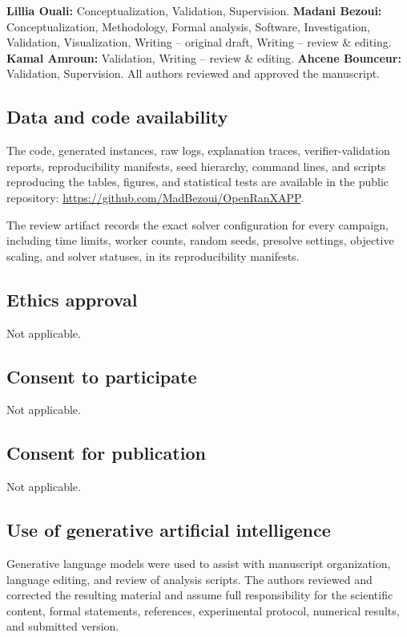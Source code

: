 \documentclass[pdflatex,sn-mathphys-num,iicol,oneside]{sn-jnl}
\begin{document}
\textbf{Lillia Ouali:} Conceptualization, Validation, Supervision. \textbf{Madani Bezoui:} Conceptualization, Methodology, Formal analysis, Software, Investigation, Validation, Visualization, Writing -- original draft, Writing -- review \& editing. \textbf{Kamal Amroun:} Validation, Writing -- review \& editing. \textbf{Ahcene Bounceur:} Validation, Supervision. All authors reviewed and approved the manuscript.

\subsection*{Data and code availability}

The code, generated instances, raw logs, explanation traces,
verifier-validation reports, reproducibility manifests, seed
hierarchy, command lines, and scripts reproducing the tables, figures,
and statistical tests are available in the public repository:
\url{https://github.com/MadBezoui/OpenRanXAPP}.

The review artifact records the exact solver configuration for every
campaign, including time limits, worker counts, random seeds,
presolve settings, objective scaling, and solver statuses, in its
reproducibility manifests.

\subsection*{Ethics approval}

Not applicable.

\subsection*{Consent to participate}

Not applicable.

\subsection*{Consent for publication}

Not applicable.

\subsection*{Use of generative artificial intelligence}

Generative language models were used to assist with manuscript
organization, language editing, and review of analysis scripts. The
authors reviewed and corrected the resulting material and assume full
responsibility for the scientific content, formal statements,
references, experimental protocol, numerical results, and submitted
version.


\end{document}
